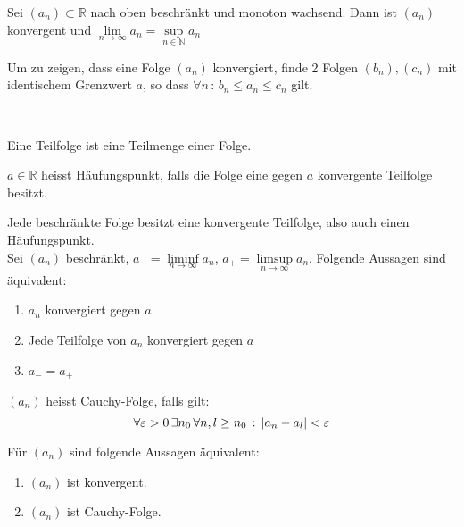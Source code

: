 	\begin{multicols}{2}
		\begin{theorem}
			Sei $(a_n) \subset \mathbb{R}$ nach oben beschränkt und monoton wachsend. Dann ist $(a_n)$ konvergent und $ \lim\limits_{n \to \infty} a_n = \sup\limits_{n \in \mathbb{N}} a_n$
		\end{theorem}
		\begin{proofhelp}
			Um zu zeigen, dass eine Folge $(a_n)$ konvergiert, finde 2 Folgen $(b_n), (c_n)$ mit identischem Grenzwert $a$, so dass $\forall n \, : \, b_n \leq a_n \leq c_n$ gilt.
		\end{proofhelp}
		\\[1em]
		\begin{definition}[Teilfolge]
			Eine Teilfolge ist eine  Teilmenge einer Folge.
		\end{definition}
		\begin{definition}[Häufungspunkt]
			$a \in \mathbb{R}$ heisst Häufungspunkt, falls die Folge eine gegen $a$ konvergente Teilfolge besitzt.
		\end{definition}
		\begin{theorem}
			Jede beschränkte Folge besitzt eine konvergente Teilfolge, also auch einen Häufungspunkt. \\[1em]
			Sei $(a_n)$ beschränkt, $a_- = \liminf\limits_{n \to \infty} a_n$, $a_+ = \limsup\limits_{n \to \infty} a_n$. Folgende Aussagen sind äquivalent:
			\begin{enumerate}
				\item $a_n$ konvergiert gegen $a$
				\item Jede Teilfolge von $a_n$ konvergiert gegen $a$
				\item $a_- = a_+$
			\end{enumerate}
		\end{theorem}
		\begin{definition}
			$(a_n)$ heisst Cauchy-Folge, falls gilt:
			$$ \forall \varepsilon > 0 \, \exists n_0 \, \forall n,l \geq n_0 \, : \, \left\vert a_n - a_l \right\vert < \varepsilon $$
		\end{definition}
		\begin{theorem}
			Für $(a_n)$ sind folgende Aussagen äquivalent:
			\begin{enumerate}
				\item $(a_n)$ ist konvergent.
				\item $(a_n)$ ist Cauchy-Folge.
			\end{enumerate}

\end{theorem}
\end{multicols}
